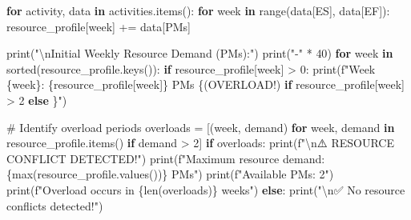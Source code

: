 \documentclass[
  letterpaper,
  DIV=11,
  numbers=noendperiod]{scrreprt}
\newenvironment{Shaded}{\begin{snugshade}}{\end{snugshade}}
\newcommand{\BuiltInTok}[1]{\textcolor[rgb]{0.00,0.23,0.31}{#1}}
\newcommand{\CharTok}[1]{\textcolor[rgb]{0.13,0.47,0.30}{#1}}
\newcommand{\CommentTok}[1]{\textcolor[rgb]{0.37,0.37,0.37}{#1}}
\newcommand{\ControlFlowTok}[1]{\textcolor[rgb]{0.00,0.23,0.31}{\textbf{#1}}}
\newcommand{\DecValTok}[1]{\textcolor[rgb]{0.68,0.00,0.00}{#1}}
\newcommand{\KeywordTok}[1]{\textcolor[rgb]{0.00,0.23,0.31}{\textbf{#1}}}
\newcommand{\NormalTok}[1]{\textcolor[rgb]{0.00,0.23,0.31}{#1}}
\newcommand{\OperatorTok}[1]{\textcolor[rgb]{0.37,0.37,0.37}{#1}}
\newcommand{\SpecialCharTok}[1]{\textcolor[rgb]{0.37,0.37,0.37}{#1}}
\newcommand{\SpecialStringTok}[1]{\textcolor[rgb]{0.13,0.47,0.30}{#1}}
\newcommand{\StringTok}[1]{\textcolor[rgb]{0.13,0.47,0.30}{#1}}
\begin{document}
\begin{Shaded}
\begin{Highlighting}[]
    \ControlFlowTok{for}\NormalTok{ activity, data }\KeywordTok{in}\NormalTok{ activities.items():}
        \ControlFlowTok{for}\NormalTok{ week }\KeywordTok{in} \BuiltInTok{range}\NormalTok{(data[}\StringTok{\textquotesingle{}ES\textquotesingle{}}\NormalTok{], data[}\StringTok{\textquotesingle{}EF\textquotesingle{}}\NormalTok{]):}
\NormalTok{            resource\_profile[week] }\OperatorTok{+=}\NormalTok{ data[}\StringTok{\textquotesingle{}PMs\textquotesingle{}}\NormalTok{]}
    
    \BuiltInTok{print}\NormalTok{(}\StringTok{"}\CharTok{\textbackslash{}n}\StringTok{Initial Weekly Resource Demand (PMs):"}\NormalTok{)}
    \BuiltInTok{print}\NormalTok{(}\StringTok{"{-}"} \OperatorTok{*} \DecValTok{40}\NormalTok{)}
    \ControlFlowTok{for}\NormalTok{ week }\KeywordTok{in} \BuiltInTok{sorted}\NormalTok{(resource\_profile.keys()):}
        \ControlFlowTok{if}\NormalTok{ resource\_profile[week] }\OperatorTok{\textgreater{}} \DecValTok{0}\NormalTok{:}
            \BuiltInTok{print}\NormalTok{(}\SpecialStringTok{f"Week }\SpecialCharTok{\{}\NormalTok{week}\SpecialCharTok{\}}\SpecialStringTok{: }\SpecialCharTok{\{}\NormalTok{resource\_profile[week]}\SpecialCharTok{\}}\SpecialStringTok{ PMs }\SpecialCharTok{\{}\StringTok{\textquotesingle{}(OVERLOAD!)\textquotesingle{}} \ControlFlowTok{if}\NormalTok{ resource\_profile[week] }\OperatorTok{\textgreater{}} \DecValTok{2} \ControlFlowTok{else} \StringTok{\textquotesingle{}\textquotesingle{}}\SpecialCharTok{\}}\SpecialStringTok{"}\NormalTok{)}
    
    \CommentTok{\# Identify overload periods}
\NormalTok{    overloads }\OperatorTok{=}\NormalTok{ [(week, demand) }\ControlFlowTok{for}\NormalTok{ week, demand }\KeywordTok{in}\NormalTok{ resource\_profile.items() }\ControlFlowTok{if}\NormalTok{ demand }\OperatorTok{\textgreater{}} \DecValTok{2}\NormalTok{]}
    \ControlFlowTok{if}\NormalTok{ overloads:}
        \BuiltInTok{print}\NormalTok{(}\SpecialStringTok{f"}\CharTok{\textbackslash{}n}\SpecialStringTok{⚠️  RESOURCE CONFLICT DETECTED!"}\NormalTok{)}
        \BuiltInTok{print}\NormalTok{(}\SpecialStringTok{f"Maximum resource demand: }\SpecialCharTok{\{}\BuiltInTok{max}\NormalTok{(resource\_profile.values())}\SpecialCharTok{\}}\SpecialStringTok{ PMs"}\NormalTok{)}
        \BuiltInTok{print}\NormalTok{(}\SpecialStringTok{f"Available PMs: 2"}\NormalTok{)}
        \BuiltInTok{print}\NormalTok{(}\SpecialStringTok{f"Overload occurs in }\SpecialCharTok{\{}\BuiltInTok{len}\NormalTok{(overloads)}\SpecialCharTok{\}}\SpecialStringTok{ weeks"}\NormalTok{)}
    \ControlFlowTok{else}\NormalTok{:}
        \BuiltInTok{print}\NormalTok{(}\StringTok{"}\CharTok{\textbackslash{}n}\StringTok{✅ No resource conflicts detected!"}\NormalTok{)}
    

\end{Highlighting}
\end{Shaded}
\end{document}
